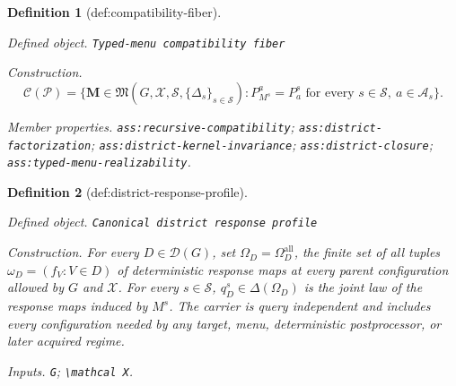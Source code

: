 \documentclass{article}
\newtheorem{definition}{Definition}
\begin{document}
\begin{definition}[def:compatibility-fiber]\label{def:compatibility-fiber}
\par\smallskip\noindent\emph{Defined object.} \texttt{Typed-\allowbreak{}menu compatibility fiber}
\par\smallskip\noindent\emph{Construction.} \[\mathcal C(\mathcal P)=\{\mathbf M\in\mathfrak M(G,\mathcal X,\mathcal S,\{\Delta_s\}_{s\in\mathcal S}):P_{M^s}^{a}=P_a^s\text{ for every }s\in\mathcal S,\ a\in\mathcal A_s\}.\]
\par\smallskip\noindent\emph{Member properties.} \texttt{ass:\allowbreak{}recursive-\allowbreak{}compatibility}; \texttt{ass:\allowbreak{}district-\allowbreak{}factorization}; \texttt{ass:\allowbreak{}district-\allowbreak{}kernel-\allowbreak{}invariance}; \texttt{ass:\allowbreak{}district-\allowbreak{}closure}; \texttt{ass:\allowbreak{}typed-\allowbreak{}menu-\allowbreak{}realizability}.
\end{definition}

\begin{definition}[def:district-response-profile]\label{def:district-response-profile}
\par\smallskip\noindent\emph{Defined object.} \texttt{Canonical district response profile}
\par\smallskip\noindent\emph{Construction.} For every \(D\in\mathcal D(G)\), set \(\Omega_D=\Omega_D^{\mathrm{all}}\), the finite set of all tuples \(\omega_D=(f_V:V\in D)\) of deterministic response maps at every parent configuration allowed by \(G\) and \(\mathcal X\).  For every \(s\in\mathcal S\), \(q_D^s\in\Delta(\Omega_D)\) is the joint law of the response maps induced by \(M^s\).  The carrier is query independent and includes every configuration needed by any target, menu, deterministic postprocessor, or later acquired regime.
\par\smallskip\noindent\emph{Inputs.} \texttt{G}; \texttt{\textbackslash{}\allowbreak{}mathcal X}.
\end{definition}
\end{document}

